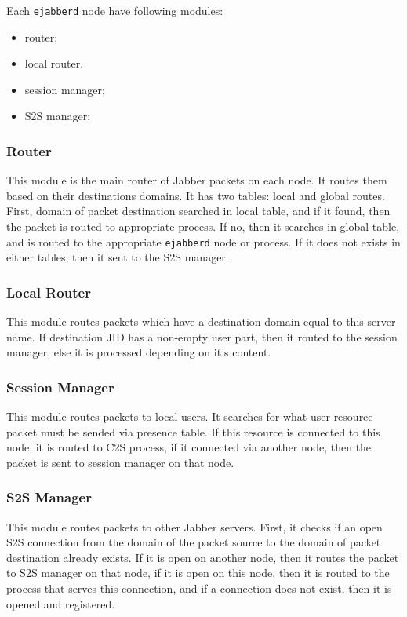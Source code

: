 \documentclass[10pt]{article}
\newcommand{\ejabberd}{\texttt{ejabberd}}
\newcommand{\Jabber}{Jabber}
\begin{document}
Each \ejabberd{} node have following modules:
\begin{itemize}
\item router;
\item local router.
\item session manager;
\item S2S manager;
\end{itemize}


\subsubsection{Router}

This module is the main router of \Jabber{} packets on each node.  It routes
them based on their destinations domains.  It has two tables: local and global
routes.  First, domain of packet destination searched in local table, and if it
found, then the packet is routed to appropriate process.  If no, then it
searches in global table, and is routed to the appropriate \ejabberd{} node or
process.  If it does not exists in either tables, then it sent to the S2S
manager.


\subsubsection{Local Router}

This module routes packets which have a destination domain equal to this server
name.  If destination JID has a non-empty user part, then it routed to the
session manager, else it is processed depending on it's content.


\subsubsection{Session Manager}

This module routes packets to local users.  It searches for what user resource
packet must be sended via presence table.  If this resource is connected to
this node, it is routed to C2S process, if it connected via another node, then
the packet is sent to session manager on that node.


\subsubsection{S2S Manager}

This module routes packets to other \Jabber{} servers.  First, it checks if an
open S2S connection from the domain of the packet source to the domain of
packet destination already exists. If it is open on another node, then it
routes the packet to S2S manager on that node, if it is open on this node, then
it is routed to the process that serves this connection, and if a connection
does not exist, then it is opened and registered.
\end{document}
